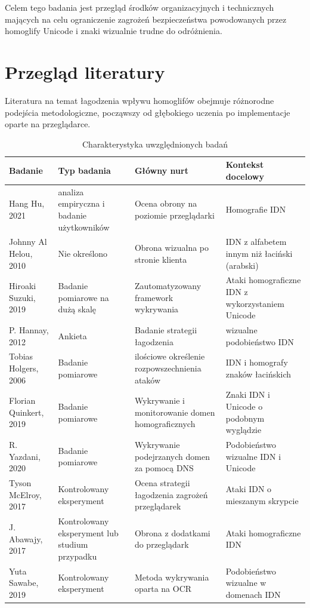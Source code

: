 Celem tego badania jest przegląd środków organizacyjnych i technicznych mających na celu ograniczenie zagrożeń bezpieczeństwa powodowanych przez homoglify Unicode i znaki wizualnie trudne do odróżnienia.

\section{Przegląd literatury}
Literatura na temat łagodzenia wpływu homoglifów obejmuje różnorodne podejścia metodologiczne, począwszy od głębokiego uczenia po implementacje oparte na przeglądarce.


\begin{table}[ht]
\centering
\caption{Charakterystyka uwzględnionych badań}
\label{tab:badaniaTab}
{\footnotesize
\begin{tabularx}{\textwidth}{p{1.75cm}p{2.5cm}p{4cm}L}
\bottomrule
\textbf{Badanie} & \textbf{Typ badania} & \textbf{Główny nurt} & \textbf{Kontekst docelowy} \\ \midrule
Hang Hu, 2021  &  analiza empiryczna i badanie użytkowników  & Ocena obrony na poziomie przeglądarki & Homografie IDN \\ 
Johnny Al Helou, 2010  & Nie określono & Obrona wizualna po stronie klienta & IDN z alfabetem innym niż łaciński (arabski) \\ 
Hiroaki Suzuki, 2019  & Badanie pomiarowe na dużą skalę & Zautomatyzowany framework wykrywania & Ataki homograficzne IDN z wykorzystaniem Unicode \\ 
P. Hannay, 2012  & Ankieta & Badanie strategii łagodzenia & wizualne podobieństwo IDN \\ 
Tobias Holgers, 2006  & Badanie pomiarowe & ilościowe określenie rozpowszechnienia ataków & IDN i homografy znaków łacińskich \\ 
Florian Quinkert, 2019  & Badanie pomiarowe & Wykrywanie i monitorowanie domen homograficznych & Znaki IDN i Unicode o podobnym wyglądzie \\ 
R. Yazdani, 2020  & Badanie pomiarowe & Wykrywanie podejrzanych domen za pomocą DNS & Podobieństwo wizualne IDN i Unicode \\ 
Tyson McElroy, 2017  & Kontrolowany eksperyment & Ocena strategii łagodzenia zagrożeń przeglądarek & Ataki IDN o mieszanym skrypcie \\ 
J. Abawajy, 2017  & Kontrolowany eksperyment lub studium przypadku & Obrona z dodatkami do przeglądark & Ataki homograficzne IDN \\ 
Yuta Sawabe, 2019 & Kontrolowany eksperyment & Metoda wykrywania oparta na OCR & Podobieństwo wizualne w domenach IDN \\ \bottomrule
\end{tabularx}
}

\end{table}


